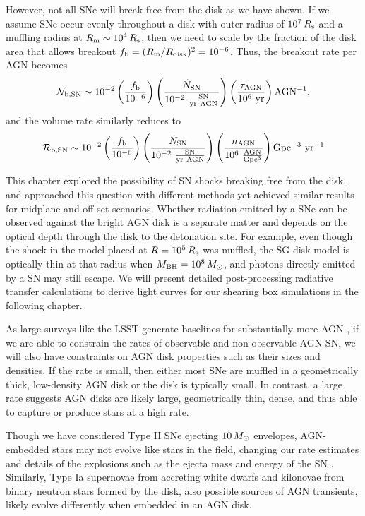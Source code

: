 However, not all SNe will break free from the disk as we have shown.
If we assume SNe occur evenly throughout a disk with outer radius of $10^7\,R_{\rm s}$ and a muffling radius at $R_{\rm m}\sim10^4\,R_{\rm s}$, then we need to scale by the fraction of the disk area that allows breakout $f_{\rm b} = (R_{\rm m} / R_{\rm disk})^{2} = 10^{-6}$.
Thus, the breakout rate per AGN becomes
\begin{equation}
    \mathcal{N_{\rm b,SN}} \sim 10^{-2} \left( \frac{f_{\rm b}}{10^{-6}} \right) \left( \frac{\dot{N}_{\rm SN}}{\rm 10^{-2}\ \frac{SN}{yr\ AGN}} \right) \left( \frac{\tau_{\rm AGN}}{\rm 10^6\ yr} \right) \mathrm{AGN^{-1}},
\end{equation}
and the volume rate similarly reduces to
\begin{equation}
    \mathcal{R_{\rm b,SN}} \sim 10^{-2} \left( \frac{f_{\rm b}}{10^{-6}} \right) \left( \frac{\dot{N}_{\rm SN}}{\rm 10^{-2}\ \frac{SN}{yr\ AGN}} \right) \left( \frac{n_{\rm AGN}}{\rm 10^6\ \frac{AGN}{Gpc^3}} \right) \mathrm{Gpc^{-3}\ yr^{-1}}
\end{equation}

This chapter explored the possibility of SN shocks breaking free from the disk.
\citet{Moranchel+21} and \citet{Grishin+21} approached this question with different methods yet achieved similar results for midplane and off-set scenarios.
Whether radiation emitted by a SNe can be observed against the bright AGN disk is a separate matter and depends on the optical depth through the disk to the detonation site.
For example, even though the shock in the model placed at $R=10^5\,R_{\rm s}$ was muffled, the SG disk model is optically thin at that radius when $M_{\rm BH}=10^8\,M_{\odot}$, and photons directly emitted by a SN may still escape.
We will present detailed post-processing radiative transfer calculations to derive light curves for our shearing box simulations in the following chapter.

As large surveys like the LSST generate baselines for substantially more AGN \citep{Kovacevic+22}, if we are able to constrain the rates of observable and non-observable AGN-SN, we will also have constraints on AGN disk properties such as their sizes and densities.
If the rate is small, then either most SNe are muffled in a geometrically thick, low-density AGN disk or the disk is typically small.
In contrast, a large rate suggests AGN disks are likely large, geometrically thin, dense, and thus able to capture or produce stars at a high rate.

Though we have considered Type II SNe ejecting $10\,M_{\odot}$ envelopes, AGN-embedded stars may not evolve like stars in the field, changing our rate estimates and details of the explosions such as the ejecta mass and energy of the SN \citep{CantielloJermynLin21, DittmannJermynCantiello23}.
Similarly, Type Ia supernovae from accreting white dwarfs and kilonovae from binary neutron stars formed by the disk, also possible sources of AGN transients, likely evolve differently when embedded in an AGN disk.

